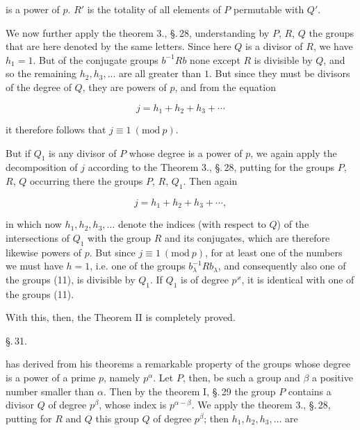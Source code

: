 is a power of $p$. $R'$ is the totality of all elements of $P$ permutable with $Q'$.

We now further apply the theorem 3., \S.\,28, understanding by $P$, $R$, $Q$ the groups that are here denoted by the same letters. Since here $Q$ is a divisor of $R$, we have $h_1 = 1$. But of the conjugate groups $b^{-1}Rb$ none except $R$ is divisible by $Q$, and so the remaining $h_2, h_3, \ldots$ are all greater than $1$. But since they must be divisors of the degree of $Q$, they are powers of $p$, and from the equation

\[
j = h_1 + h_2 + h_3 + \cdots
\]

it therefore follows that $j \equiv 1\ (\mathrm{mod}\ p)$.

But if $Q_1$ is any divisor of $P$ whose degree is a power of $p$, we again apply the decomposition of $j$ according to the Theorem 3., \S.\,28, putting for the groups $P$, $R$, $Q$ occurring there the groups $P$, $R$, $Q_1$. Then again

\[
j = h_1 + h_2 + h_3 + \cdots,
\]

in which now $h_1, h_2, h_3, \ldots$ denote the indices (with respect to $Q$) of the intersections of $Q_1$ with the group $R$ and its conjugates, which are therefore likewise powers of $p$. %
But since $j \equiv 1\ (\mathrm{mod}\ p)$, for at least one of the numbers we must have $h = 1$, i.e. one of the groups $b_\lambda^{-1}Rb_\lambda$, and consequently also one of the groups (11), is divisible by $Q_1$. If $Q_1$ is of degree $p^\varkappa$, it is identical with one of the groups (11).

With this, then, the Theorem II is completely proved.

\begin{center}
\S.\,31.

\end{center}

 has derived from his theorems a remarkable property of the groups whose degree is a power of a prime $p$, namely $p^\alpha$. Let $P$, then, be such a group and $\beta$ a positive number smaller than $\alpha$. Then by the theorem I, \S.\,29 the group $P$ contains a divisor $Q$ of degree $p^\beta$, whose index is $p^{\alpha-\beta}$. We apply the theorem 3., \S.\,28, putting for $R$ and $Q$ this group $Q$ of degree $p^\beta$; then $h_1, h_2, h_3, \ldots$ are
